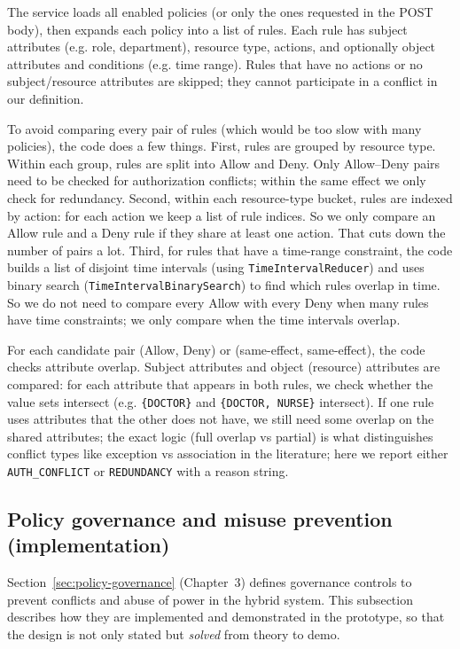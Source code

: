 The service loads all enabled policies (or only the ones requested in the POST body), then expands each policy into a list of rules. Each rule has subject attributes (e.g. role, department), resource type, actions, and optionally object attributes and conditions (e.g. time range). Rules that have no actions or no subject/resource attributes are skipped; they cannot participate in a conflict in our definition.
\vspace{0.5cm}


To avoid comparing every pair of rules (which would be too slow with many policies), the code does a few things. First, rules are grouped by resource type. Within each group, rules are split into Allow and Deny. Only Allow--Deny pairs need to be checked for authorization conflicts; within the same effect we only check for redundancy. Second, within each resource-type bucket, rules are indexed by action: for each action we keep a list of rule indices. So we only compare an Allow rule and a Deny rule if they share at least one action. That cuts down the number of pairs a lot. Third, for rules that have a time-range constraint, the code builds a list of disjoint time intervals (using \texttt{TimeIntervalReducer}) and uses binary search (\texttt{TimeIntervalBinarySearch}) to find which rules overlap in time. So we do not need to compare every Allow with every Deny when many rules have time constraints; we only compare when the time intervals overlap.
\vspace{0.5cm}


For each candidate pair (Allow, Deny) or (same-effect, same-effect), the code checks attribute overlap. Subject attributes and object (resource) attributes are compared: for each attribute that appears in both rules, we check whether the value sets intersect (e.g. \texttt{\{DOCTOR\}} and \texttt{\{DOCTOR, NURSE\}} intersect). If one rule uses attributes that the other does not have, we still need some overlap on the shared attributes; the exact logic (full overlap vs partial) is what distinguishes conflict types like exception vs association in the literature; here we report either \texttt{AUTH\_CONFLICT} or \texttt{REDUNDANCY} with a reason string.
\vspace{0.5cm}

\subsection{Policy governance and misuse prevention (implementation)}
\label{sec:governance-implementation}
Section~\ref{sec:policy-governance} (Chapter~3) defines governance controls to prevent conflicts and abuse of power in the hybrid system. This subsection describes how they are implemented and demonstrated in the prototype, so that the design is not only stated but \emph{solved} from theory to demo.
\vspace{0.5cm}

